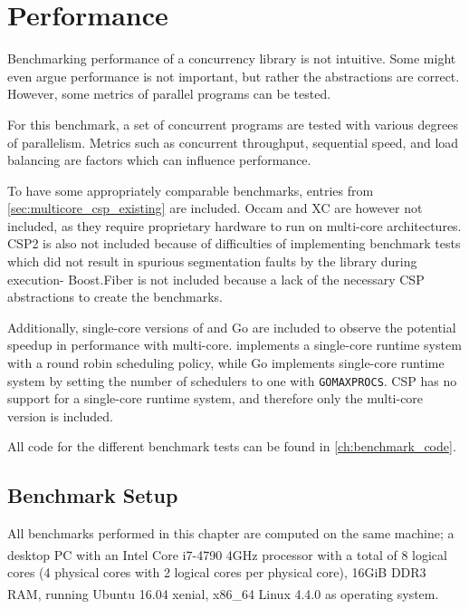 
\chapter{Performance}
\label{ch:performance}


Benchmarking performance of a concurrency library is not intuitive. Some might even argue performance is not important, but rather the abstractions are correct. However, some metrics of parallel programs can be tested.

For this benchmark, a set of concurrent programs are tested with various degrees of parallelism. Metrics such as concurrent throughput, sequential speed, and load balancing are factors which can influence performance.

To have some appropriately comparable benchmarks, entries from \cref{sec:multicore_csp_existing} are included. Occam and XC are however not included, as they require proprietary hardware to run on multi\hyp{}core architectures. \Cpp{}CSP2 is also not included because of difficulties of implementing benchmark tests which did not result in spurious segmentation faults by the library during execution- Boost.Fiber is not included because a lack of the necessary CSP abstractions to create the benchmarks.

Additionally, single\hyp{}core versions of \Proxc{} and Go are included to observe the potential speedup in performance with multi\hyp{}core. \Proxc{} implements a single\hyp{}core runtime system with a round robin scheduling policy, while Go implements single\hyp{}core runtime system by setting the number of schedulers to one with \texttt{GOMAXPROCS}. \Cpp{}CSP has no support for a single\hyp{}core runtime system, and therefore only the multi\hyp{}core version is included.

All code for the different benchmark tests can be found in \cref{ch:benchmark_code}.


\section{Benchmark Setup}
\label{sec:benchmark_setup}


All benchmarks performed in this chapter are computed on the same machine; a desktop PC with an Intel\textsuperscript{\textregistered} Core\textsuperscript{\texttrademark} i7-4790 4GHz processor with a total of 8 logical cores (4 physical cores with 2 logical cores per physical core), 16GiB DDR3 RAM, running Ubuntu\textsuperscript{\textregistered} 16.04 xenial, x86\_64 Linux\textsuperscript{\textregistered} 4.4.0 as operating system.

